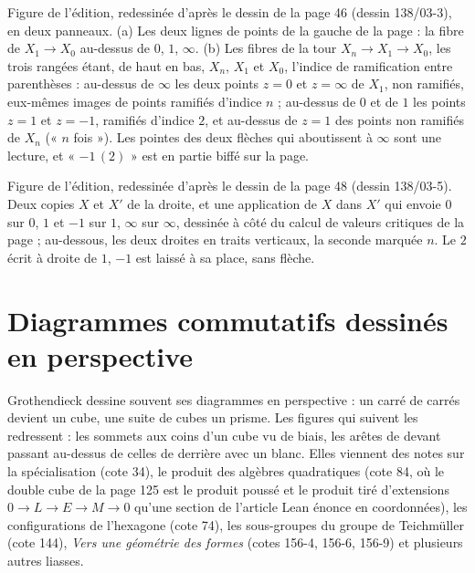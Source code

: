 \documentclass[11pt,a4paper]{article}
\newcommand{\legende}[1]{{\centering\small\color{gray!60!black}#1\par}\medskip}
\newcommand{\cote}[2]{\par\smallskip\noindent{\small\textbf{Cote #1, page #2.}}\par\nopagebreak}
\begin{document}
\legende{Figure de l'édition, redessinée d'après le dessin de la page 46 (dessin 138/03-3), en deux panneaux. (a) Les deux lignes de points de la gauche de la page : la fibre de $X_{1} \to X_{0}$ au-dessus de $0$, $1$, $\infty$. (b) Les fibres de la tour $X_{n} \to X_{1} \to X_{0}$, les trois rangées étant, de haut en bas, $X_{n}$, $X_{1}$ et $X_{0}$, l'indice de ramification entre parenthèses : au-dessus de $\infty$ les deux points $z = 0$ et $z = \infty$ de $X_{1}$, non ramifiés, eux-mêmes images de points ramifiés d'indice $n$ ; au-dessus de $0$ et de $1$ les points $z = 1$ et $z = -1$, ramifiés d'indice $2$, et au-dessus de $z = 1$ des points non ramifiés de $X_{n}$ (« $n$ fois »). Les pointes des deux flèches qui aboutissent à $\infty$ sont une lecture, et « $-1\,(2)$ » est en partie biffé sur la page.}

\cote{138}{48}
\begin{center}
\end{center}
\legende{Figure de l'édition, redessinée d'après le dessin de la page 48 (dessin 138/03-5). Deux copies $X$ et $X'$ de la droite, et une application de $X$ dans $X'$ qui envoie $0$ sur $0$, $1$ et $-1$ sur $1$, $\infty$ sur $\infty$, dessinée à côté du calcul de valeurs critiques de la page ; au-dessous, les deux droites en traits verticaux, la seconde marquée $n$. Le $2$ écrit à droite de $1$, $-1$ est laissé à sa place, sans flèche.}


\section{Diagrammes commutatifs dessinés en perspective}

Grothendieck dessine souvent ses diagrammes en perspective : un carré de carrés devient un cube, une suite de cubes un prisme. Les figures qui suivent les redressent : les sommets aux coins d'un cube vu de biais, les arêtes de devant passant au-dessus de celles de derrière avec un blanc. Elles viennent des notes sur la spécialisation (cote 34), le produit des algèbres quadratiques (cote 84, où le double cube de la page 125 est le produit poussé et le produit tiré d'extensions $0 \to L \to E \to M \to 0$ qu'une section de l'article Lean énonce en coordonnées), les configurations de l'hexagone (cote 74), les sous-groupes du groupe de Teichmüller (cote 144), \emph{Vers une géométrie des formes} (cotes 156-4, 156-6, 156-9) et plusieurs autres liasses.
\end{document}
